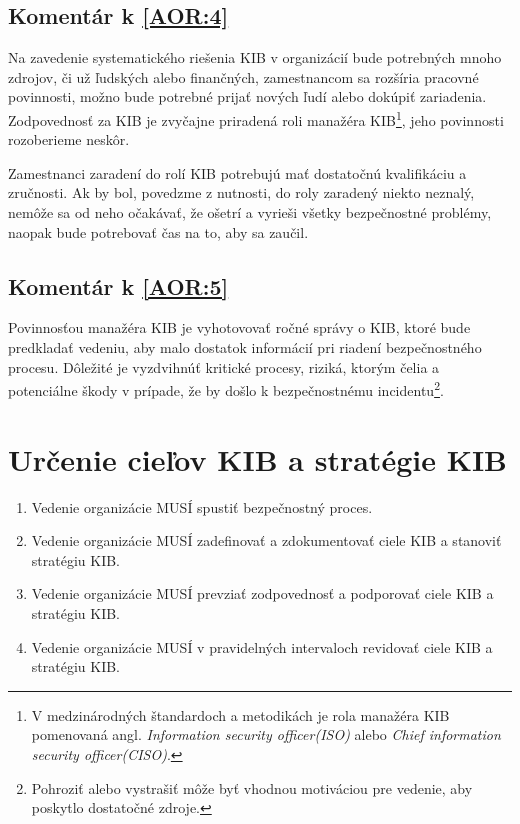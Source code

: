 \subsection*{Komentár k \ref{AOR:4}}
Na zavedenie systematického riešenia KIB v organizácií bude potrebných mnoho zdrojov,
či už ľudských alebo finančných, zamestnancom sa rozšíria pracovné povinnosti, možno bude potrebné prijať nových ľudí
alebo dokúpiť zariadenia. Zodpovednosť za KIB je zvyčajne priradená roli manažéra KIB\footnote{V medzinárodných štandardoch
a metodikách je rola manažéra KIB pomenovaná angl. \textit{Information security officer(ISO)} alebo \textit{Chief information
security officer(CISO)}.}, jeho povinnosti rozoberieme neskôr. 

Zamestnanci zaradení do rolí KIB potrebujú mať dostatočnú kvalifikáciu a zručnosti. Ak by bol, povedzme z nutnosti, do roly
zaradený niekto neznalý, nemôže sa od neho očakávať, že ošetrí a vyrieši všetky bezpečnostné problémy, naopak bude potrebovať
čas na to, aby sa zaučil.

\subsection*{Komentár k \ref{AOR:5}}
Povinnosťou manažéra KIB je vyhotovovať ročné správy o KIB, ktoré bude predkladať vedeniu, aby malo dostatok informácií
pri riadení bezpečnostného procesu. Dôležité je vyzdvihnúť kritické procesy, riziká, ktorým čelia a potenciálne škody v
prípade, že by došlo k bezpečnostnému incidentu\footnote{Pohroziť alebo vystrašiť môže byť vhodnou motiváciou pre vedenie, aby poskytlo
dostatočné zdroje.}.

\section{Určenie cieľov KIB a stratégie KIB}
\begin{enumerate}
  \item \label{SOS:1} Vedenie organizácie MUSÍ spustiť bezpečnostný proces.
  \item \label{SOS:2} Vedenie organizácie MUSÍ zadefinovať a zdokumentovať ciele KIB a stanoviť stratégiu KIB.
  \item \label{SOS:3} Vedenie organizácie MUSÍ prevziať zodpovednosť a podporovať ciele KIB a stratégiu KIB.
  \item \label{SOS:4} Vedenie organizácie MUSÍ v pravidelných intervaloch revidovať ciele KIB a stratégiu KIB.
\end{enumerate}

